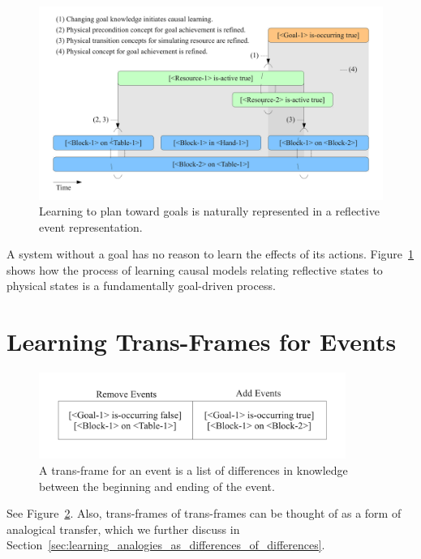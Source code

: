 \begin{figure}[bth]
  \center
  \includegraphics[width=12cm]{gfx/learning_to_plan}
  \caption[Learning to plan toward goals]{Learning to plan toward
    goals is naturally represented in a reflective event
    representation.}
  \label{fig:learning_to_plan}
\end{figure}

A system without a goal has no reason to learn the effects of its
actions.  Figure~\ref{fig:learning_to_plan} shows how the process of
learning causal models relating reflective states to physical states
is a fundamentally goal-driven process.



\section{Learning Trans-Frames for Events}
\label{sec:learning_trans_frames_for_events}

\begin{figure}[bth]
  \center
  \includegraphics[width=10cm]{gfx/transframe}
  \caption[A trans-frame for an event]{A trans-frame for an event is a
    list of differences in knowledge between the beginning and ending
    of the event.}
  \label{fig:transframe}
\end{figure}

See Figure~\ref{fig:transframe}.  Also, trans-frames of trans-frames
can be thought of as a form of analogical transfer, which we further
discuss in
Section~\ref{sec:learning_analogies_as_differences_of_differences}.


